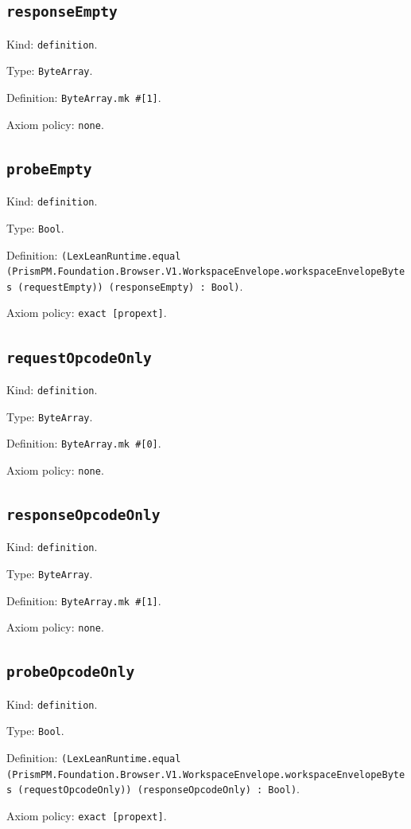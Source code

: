 \documentclass[11pt]{article}
\begin{document}
\subsection*{\texttt{responseEmpty}}
\noindent Kind: \texttt{definition}.\par
\noindent Type: \texttt{ByteArray}.\par
\noindent Definition: \texttt{ByteArray.mk \#[1]}.\par
\noindent Axiom policy: \texttt{none}.\par
\subsection*{\texttt{probeEmpty}}
\noindent Kind: \texttt{definition}.\par
\noindent Type: \texttt{Bool}.\par
\noindent Definition: \texttt{(LexLeanRuntime.equal (PrismPM.Foundation.Browser.V1.WorkspaceEnvelope.workspaceEnvelopeBytes (requestEmpty)) (responseEmpty) : Bool)}.\par
\noindent Axiom policy: \texttt{exact [propext]}.\par
\subsection*{\texttt{requestOpcodeOnly}}
\noindent Kind: \texttt{definition}.\par
\noindent Type: \texttt{ByteArray}.\par
\noindent Definition: \texttt{ByteArray.mk \#[0]}.\par
\noindent Axiom policy: \texttt{none}.\par
\subsection*{\texttt{responseOpcodeOnly}}
\noindent Kind: \texttt{definition}.\par
\noindent Type: \texttt{ByteArray}.\par
\noindent Definition: \texttt{ByteArray.mk \#[1]}.\par
\noindent Axiom policy: \texttt{none}.\par
\subsection*{\texttt{probeOpcodeOnly}}
\noindent Kind: \texttt{definition}.\par
\noindent Type: \texttt{Bool}.\par
\noindent Definition: \texttt{(LexLeanRuntime.equal (PrismPM.Foundation.Browser.V1.WorkspaceEnvelope.workspaceEnvelopeBytes (requestOpcodeOnly)) (responseOpcodeOnly) : Bool)}.\par
\noindent Axiom policy: \texttt{exact [propext]}.\par
\end{document}
